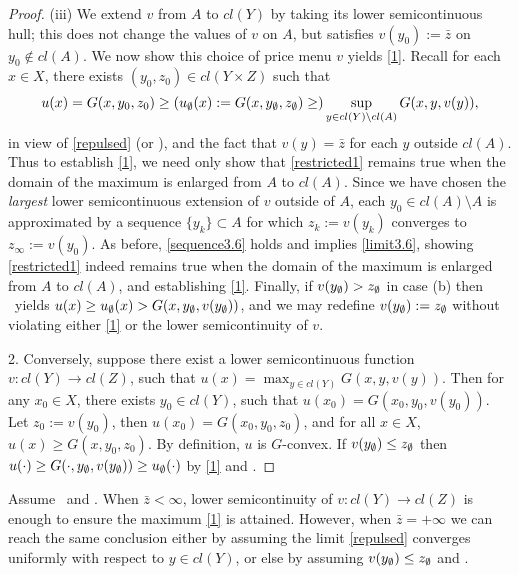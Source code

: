 \begin{proof}
	{(iii)} We extend $v$ from $A$ to $cl(Y)$ by taking its lower semicontinuous hull;
			this does not change the values of $v$ on $A$, but satisfies $v(y_0) := \bar z$  on $y_0 \notin cl(A)$.
			We now 	show this choice of price menu $v$ yields \eqref{1}. 
			Recall for each $x \in X$,  there exists $(y_0,z_0) \in cl(Y \times Z)$ such that
				\begin{equation*}
				u(x) = G(x,y_0,z_0) \ge (u_{\emptyset}(x) := G(x,y_{\emptyset},z_{\emptyset}) \ge) \sup_{y \in cl(Y)\setminus cl(A)} G(x,y,v(y)),
				\end{equation*}
			in view of \eqref{repulsed} (or \Gfive), and the fact that $v(y) = \bar z$ for each $y$ outside $cl(A)$.
			Thus to establish \eqref{1},  we need only show that \eqref{restricted1} remains true when
			the domain of the maximum is enlarged from $A$ to $cl(A)$.
			Since we have chosen the {\em largest} lower semicontinuous extension of $v$ outside of $A$,
			each $y_0 \in cl(A) \setminus A$ is approximated by a sequence  $\{y_{k}\}\subset A$
			for which $z_k := v(y_k)$ converges to $z_\infty :=v(y_0)$. As before, \eqref{sequence3.6} holds
			and implies \eqref{limit3.6}, showing \eqref{restricted1} indeed remains true when
			the domain of the maximum is enlarged from $A$ to $cl(A)$, and establishing \eqref{1}.
			Finally, if $v(y_{\emptyset}) > z_{\emptyset}$ in case (b) then \Gfour\ yields $u(x) \ge u_{\emptyset}(x) > G(x,y_{\emptyset},v(y_{\emptyset}))$, and
			we may redefine $v(y_{\emptyset}):=z_{\emptyset}$ without violating either \eqref{1} or the lower semicontinuity of $v$.\medskip
							
	2. Conversely, suppose there exist a lower semicontinuous function $v: cl(Y)\longrightarrow cl(Z)$, such that $u(x)=\max_{y\in {cl(Y)}} G(x, y,v(y))$. Then for any $x_0\in X$, there exists $y_0 \in cl(Y)$, such that $u(x_0) = G(x_0, y_0, v(y_0))$. Let $z_0:= v(y_0)$, then $u(x_0)= G(x_0, y_0, z_0)$, and for all $x\in X$, $u(x)\ge G(x, y_0, z_0)$. By definition, $u$ is $G$-convex.   If $v(y_{\emptyset}) \le z_{\emptyset}$ then $u(\cdot) \ge G(\cdot ,y_{\emptyset},v(y_{\emptyset})) \ge u_{\emptyset}(\cdot)$ 
	by \eqref{1} and \Gfour.
\end{proof}
							
							
\begin{remark} Assume \Gzero\ and \Gfour.
	When $\bar z< \infty$,  lower semicontinuity of $v:cl(Y) \longrightarrow cl(Z)$ is enough to ensure the maximum 
	\eqref{1} is attained.  However, when $\bar z=+\infty$ we can reach the same conclusion either by assuming the limit \eqref{repulsed} converges uniformly with respect to  $y \in cl(Y)$,  or else by assuming $v(y_{\emptyset}) \le z_{\emptyset}$ and \Gfive.
\end{remark}
								
